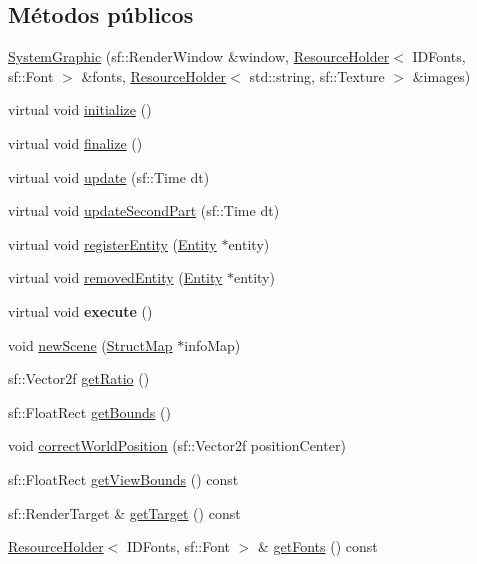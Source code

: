 \subsection*{Métodos públicos}
\begin{DoxyCompactItemize}
\item 
\hyperlink{classSystemGraphic_a5c1878f11c82193606c51d4b10bd05f6}{System\+Graphic} (sf\+::\+Render\+Window \&window, \hyperlink{classResourceHolder}{Resource\+Holder}$<$ I\+D\+Fonts, sf\+::\+Font $>$ \&fonts, \hyperlink{classResourceHolder}{Resource\+Holder}$<$ std\+::string, sf\+::\+Texture $>$ \&images)
\item 
virtual void \hyperlink{classSystemGraphic_a792331587037bbf7fdfdd487cd45575a}{initialize} ()
\item 
virtual void \hyperlink{classSystemGraphic_af59c303890f7faf14db27ab746a23d3a}{finalize} ()
\item 
virtual void \hyperlink{classSystemGraphic_aaabd7eb4e9ce5d82dd39126239818283}{update} (sf\+::\+Time dt)
\item 
virtual void \hyperlink{classSystemGraphic_a0d46ab172987eed86b45ae016240034e}{update\+Second\+Part} (sf\+::\+Time dt)
\item 
virtual void \hyperlink{classSystemGraphic_a7b905fc340431b0521b975d82ef2fa45}{register\+Entity} (\hyperlink{classEntity}{Entity} $\ast$entity)
\item 
virtual void \hyperlink{classSystemGraphic_a9dba6a98242f2c5f07bd52301bc3dacb}{removed\+Entity} (\hyperlink{classEntity}{Entity} $\ast$entity)
\item 
\hypertarget{classSystemGraphic_a8b271e0b06df79aa780c52610042156d}{}virtual void {\bfseries execute} ()\label{classSystemGraphic_a8b271e0b06df79aa780c52610042156d}

\item 
void \hyperlink{classSystemGraphic_a926ff22280da8f657ae8b79fec5e88cd}{new\+Scene} (\hyperlink{structStructMap}{Struct\+Map} $\ast$info\+Map)
\item 
sf\+::\+Vector2f \hyperlink{classSystemGraphic_a3e38f35aebdd76068690b131c9be5904}{get\+Ratio} ()
\item 
sf\+::\+Float\+Rect \hyperlink{classSystemGraphic_a2160ae459d04c6594d824860bbda33d9}{get\+Bounds} ()
\item 
void \hyperlink{classSystemGraphic_abfc8f2497c4507fe45d4c2909bfeb6b3}{correct\+World\+Position} (sf\+::\+Vector2f position\+Center)
\item 
sf\+::\+Float\+Rect \hyperlink{classSystemGraphic_a7478ad387903d1d9cc31d4aa21aa3a8f}{get\+View\+Bounds} () const 
\item 
sf\+::\+Render\+Target \& \hyperlink{classSystemGraphic_a5b0dbf485eeaafc22d013b4a9768ebc6}{get\+Target} () const 
\item 
\hyperlink{classResourceHolder}{Resource\+Holder}$<$ I\+D\+Fonts, sf\+::\+Font $>$ \& \hyperlink{classSystemGraphic_a97463e77f261e4f733b0d7c9bcd9f56d}{get\+Fonts} () const 
\end{DoxyCompactItemize}
